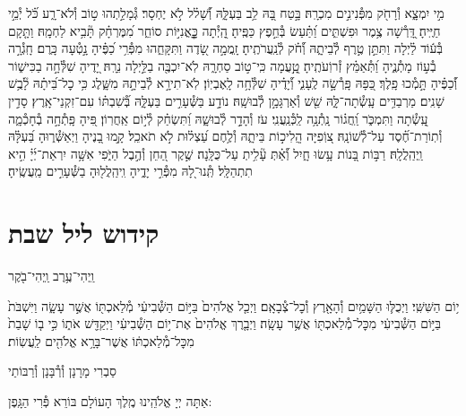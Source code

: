 \documentclass[twoside, openany, parskip=half, 11pt]{book}
\begin{document}
מִ֣י יִמְצָ֑א וְ֯רָחֹ֖ק מִפְּ֯נִינִ֣ים מִכְרָֽהּ׃ \hfill \break
בָּ֣טַח בָּ֭הּ לֵ֥ב בַּעְלָּ֑הּ וְ֝֯שָׁל֗ל לֹ֣א יֶחְסָר׃ \hfill \break
גְּ֯מָלַ֣תְהוּ ט֣וֹב וְ֯לֹא־רָ֑ע כֹּ֝֗ל יְ֯מֵ֣י חַיֶּֽיהָ׃ \hfill \break
דָּֽ֭רְ֯שָׁה צֶ֥מֶר וּפִשְׁתִּ֑ים וַ֝תַּ֗עַשׂ בְּ֯חֵ֣פֶץ כַּפֶּֽיהָ׃ \hfill \break
הָֽ֭יְ֯תָה כׇׇׇׇׇׇׇׇׇּֽאֳנִיּ֣וֹת סוֹחֵ֑ר מִ֝מֶּרְחָ֗ק תָּ֘בִ֥יא לַחְמָֽהּ׃ \hfill \break
וַתָּ֤קָם בְּ֯ע֬וֹד לַ֗יְלָה וַתִּתֵּ֣ן טֶ֣רֶף לְ֯בֵיתָ֑הּ וְ֝֯חֹ֗ק לְ֯נַֽעֲרֹתֶֽיהָ׃ \hfill \break
זָֽמֲמָ֣ה שָׂ֭דֶה וַתִּקָּחֵ֑הוּ מִפְּ֯רִ֥י כַ֝פֶּ֗יהָ נָ֣טְ֯עָה כָּֽרֶם׃ \hfill \break
חָֽגְ֯רָ֣ה בְ֯ע֣וֹז מָתְ֯נֶ֑יהָ וַ֝תְּ֯אַמֵּ֗ץ זְ֯רוֹֽעֹתֶֽיהָ׃ \hfill \break
טָֽ֣֭עֲמָה כִּֽי־ט֣וֹב סַחְרָ֑הּ לֹֽא־יִכְבֶּ֖ה בַלַּ֣יְלָה נֵרָֽהּ׃ \hfill \break
יָ֭דֶיהָ שִׁלְּ֯חָ֣ה בַכִּישׁ֑וֹר וְ֝֯כַפֶּ֗יהָ תָּ֣מְ֯כוּ פָֽלֶךְ׃ \hfill \break
כַּ֭פָּהּ פָּֽרְ֯שָׂ֣ה לֶֽעָנִ֑י וְ֝֯יָדֶ֗יהָ שִׁלְּ֯חָ֥ה לָֽאֶבְיֽוֹן׃ \hfill \break
לֹֽא־תִירָ֣א לְ֯בֵיתָ֣הּ מִשָּׁ֑לֶג כִּ֥י כׇל־בֵּ֝יתָ֗הּ לָ֘בֻ֥שׁ שָׁנִֽים׃ \hfill \break
מַרְבַדִּ֥ים עָֽשְׂ֯תָה־לָּ֑הּ שֵׁ֖שׁ וְ֯אַרְגָּמָ֣ן לְ֯בוּשָֽׁהּ׃ \hfill \break
נוֹדָ֣ע בַּשְּׁ֯עָרִ֣ים בַּעְלָּ֑הּ בְּ֝֯שִׁבְתּ֗וֹ עִם־זִקְנֵי־אָֽרֶץ׃ \hfill \break
סָדִ֣ין עָֽ֭שְׂ֯תָה וַתִּמְכֹּ֑ר וַֽ֝חֲג֗וֹר נָֽתְ֯נָ֥ה לַֽכְּ֯נַֽעֲנִֽי׃ \hfill \break
עֹז וְ֯הָדָ֣ר לְ֯בוּשָׁ֑הּ וַ֝תִּשְׂחַ֗ק לְ֯י֣וֹם אַֽחֲרֽוֹן׃ \hfill \break
פִּ֭יהָ פָּֽתְ֯חָ֣ה בְ֯חָכְ֯מָ֑ה וְ֯תֽוֹרַת־חֶ֝֗סֶד עַל־לְ֯שׁוֹנָֽהּ׃ \hfill \break
צ֭וֹֽפִיָּה הֲֽלִיכ֣וֹת בֵּיתָ֑הּ וְ֯לֶ֥חֶם עַ֝צְל֗וּת לֹ֣א תֹאכֵֽל׃ \hfill \break
קָ֣מוּ בָ֭נֶיהָ וַיְאַשְּׁ֯ר֑וּהָ בַּ֝עְלָּ֗הּ וַֽיְהַֽלֲלָֽהּ׃ \hfill \break
רַבּ֣וֹת בָּ֭נוֹת עָ֥שׂוּ חָ֑יִל וְ֝֯אַ֗תְּ עָ֘לִ֥יתְ עַל־כֻּלָּֽנָה׃ \hfill \break
שֶׁ֣קֶר הַ֭חֵן וְ֯הֶ֣בֶל הַיֹּ֑פִי אִשָּׁ֥ה יִרְאַת־יְ֜יָ֗ הִ֣יא תִתְהַלָּֽל׃\hfill \break
תְּֽ֯נוּ־לָ֭הּ מִפְּ֯רִ֣י יָדֶ֑יהָ וִֽיהַֽלֲל֖וּהָ בַשְּׁ֯עָרִ֣ים מַֽעֲשֶֽׂיהָ׃\hfill \break


\section*{ קידוש ליל שבת }

\begin{small}וַֽיְהִי־עֶ֥רֶב וַֽיְהִי־בֹ֖קֶר\end{small}
י֥וֹם הַשִּׁשִּֽׁי׃ וַיְכֻלּ֛וּ הַשָּׁמַ֥יִם וְ֯הָאָ֖רֶץ וְ֯כׇל־צְ֯בָאָֽם׃ וַיְכַ֤ל אֱלֹהִים֙ בַּיּ֣וֹם הַשְּׁ֯בִיעִ֔י מְ֯לַאכְתּ֖וֹ אֲשֶׁ֣ר עָשָׂ֑ה וַיִּשְׁבֹּת֙ בַּיּ֣וֹם הַשְּׁ֯בִיעִ֔י מִכׇּל־מְ֯לַאכְתּ֖וֹ אֲשֶׁ֥ר עָשָֽׂה׃ וַיְבָ֤רֶךְ אֱלֹהִים֙ אֶת־י֣וֹם הַשְּׁ֯בִיעִ֔י וַיְקַדֵּ֖שׁ אֹת֑וֹ כִּ֣י ב֤וֹ שָׁבַת֙ מִכׇּל־מְ֯לַאכְתּ֔וֹ אֲשֶׁר־בָּרָ֥א אֱלֹהִ֖ים לַֽעֲשֽׂוֹת׃

\begin{footnotesize}
סַבְרִי מָרָנָן וְ֯רְ֯בָּנָן וְ֯רַבּוֹתַי\\
\end{footnotesize}
אַתָּה יְיָ אֱלֹהֵֽינוּ מֶֽלֶךְ הָעוֹלָם בּוֹרֵא פְּ֯רִי הַגָּֽפֶן:
\end{document}
